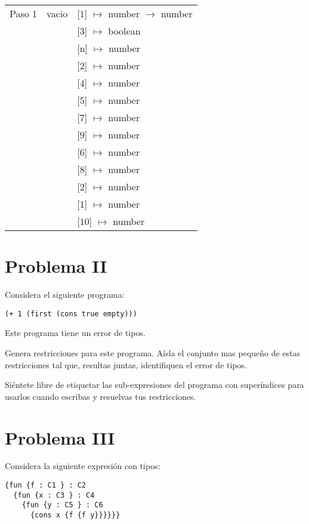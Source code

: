 \documentclass{article}
\begin{document}
\begin{center}
\begin{longtable}{ | l | p{10 cm} | p{5 cm} | }
 Paso 1  & vacio& [$\boxed{1}$] $\mapsto$ number $\rightarrow$ number \\ 
	 &	& [$\boxed{3}$] $\mapsto$ boolean \\
	 &	& [n] $\mapsto$ number \\
	 &	& [2] $\mapsto$ number \\
	 &	& [$\boxed{4}$] $\mapsto$ number \\
	 &	& [$\boxed{5}$] $\mapsto$ number \\
	 &	& [$\boxed{7}$] $\mapsto$ number \\ 
	 &	& [$\boxed{9}$] $\mapsto$ number \\ 
	 &	& [$\boxed{6}$] $\mapsto$ number \\ 
	 &	& [$\boxed{8}$] $\mapsto$ number \\ 
	 &	& [$\boxed{2}$] $\mapsto$ number \\ 
	 &	& [1] $\mapsto$ number \\ 
	 &	& [$\boxed{10}$] $\mapsto$ number \\ \hline
 \end{longtable}

\end{center}

\section*{Problema II}
Considera el siguiente programa:

\begin{verbatim}
(+ 1 (first (cons true empty)))
\end{verbatim}

Este programa tiene un error de tipos.

Genera restricciones para este programa. Aísla el conjunto mas pequeño de
estas restricciones tal que, resultas juntas, identifiquen el error de tipos.

Siéntete libre de etiquetar las sub-expresiones del programa con superíndices
para usarlos cuando escribas y resuelvas tus restricciones.

\section*{Problema III}
Considera la siguiente expresión con tipos:

\begin{verbatim}
{fun {f : C1 } : C2
  {fun {x : C3 } : C4
    {fun {y : C5 } : C6
      {cons x {f {f y}}}}}}
\end{verbatim}
\end{document}
